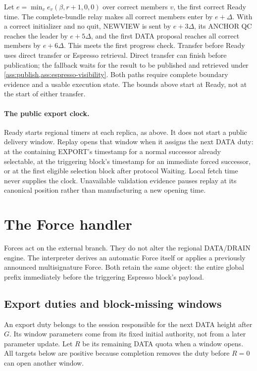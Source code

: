 \documentclass[11pt,a4paper]{article}
\newcounter{protocol}
\begin{document}
Let $e=\min_v e_v(\beta,r+1,0,0)$ over correct members $v$, the
first correct Ready time. The complete-bundle relay makes
all correct members enter by $e+\Delta$. With a correct initializer and
no quit, NEWVIEW is sent by $e+3\Delta$, its ANCHOR QC reaches the
leader by $e+5\Delta$, and the first DATA proposal reaches all correct
members by $e+6\Delta$. This meets the first progress check. Transfer
before Ready uses direct transfer or Espresso retrieval. Direct transfer
can finish before publication; the fallback waits for the result to be
published and retrieved under \cref{ass:publish,ass:espresso-visibility}.
Both paths require complete boundary evidence and a usable execution state.
The bounds above start at Ready, not at the start of either transfer.



\paragraph{The public export clock.}
Ready starts regional timers at each replica, as above. It does not
start a public delivery window. Replay opens that window when it
assigns the next DATA duty: at the containing EXPORT's timestamp for
a normal successor already selectable, at the triggering block's
timestamp for an immediate forced successor, or at the first eligible
selection block after protocol Waiting. Local fetch time never supplies
the clock. Unavailable validation evidence pauses replay at its
canonical position rather than manufacturing a new opening time.

\section{The Force handler}
\label{sec:force}
Forces act on the external branch. They do not alter the regional
DATA/DRAIN engine. The interpreter derives an automatic Force itself
or applies a previously announced multisignature Force.
Both retain the same object: the entire global prefix immediately
before the triggering Espresso block's payload.

\subsection{Export duties and block-missing windows}
\label{sec:windows}
An export duty belongs to the session responsible for the next DATA
height after $G$. Its window parameters come from its fixed initial
authority, not from a later parameter update.
Let $R$ be its remaining DATA quota when a window opens. All targets
below are positive because completion removes the duty before $R=0$
can open another window.
\end{document}
